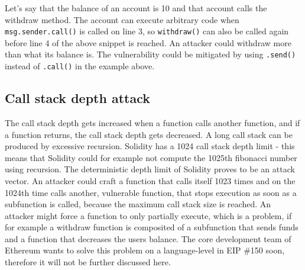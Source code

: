 

Let's say that the balance of an account is 10 and that account calls the withdraw method. The account can execute arbitrary code when \texttt{msg.sender.call()} is called on line 3, so \texttt{withdraw()} can also be called again before line 4 of the above snippet is reached. An attacker could withdraw more than what its balance is. The vulnerability could be mitigated by using \texttt{.send()} instead of \texttt{.call()} in the example above.

\subsection{Call stack depth attack}

The call stack depth gets increased when a function calls another function, and if a function returns, the call stack depth gets decreased. A long call stack can be produced by excessive recursion. Solidity has a 1024 call stack depth limit - this means that Solidity could for example not compute the 1025th fibonacci number using recursion.
The deterministic depth limit of Solidity proves to be an attack vector. An attacker could craft a function that calls itself 1023 times and on the 1024th time calls another, vulnerable function, that stops execution as soon as a subfunction is called, because the maximum call stack size is reached. An attacker might force a function to only partially execute, which is a problem, if for example a withdraw function is composited of a subfunction that sends funds and a function that decreases the users balance.
The core development team of Ethereum wants to solve this problem on a language-level in EIP \#150 soon, therefore it will not be further discussed here.